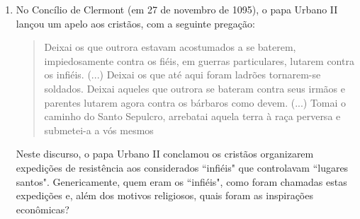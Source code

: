 \documentclass[10pt,a4paper]{article}
\begin{document}
\begin{multicols}{2}
\begin{enumerate}
		\begin{enumerate}
		\item igualit\'aria, com um n\'ivel satisfat\'orio de distribui\c{c}\~ao da renda.
		\item estagnada, com uma relativa harmonia entre as classes.   
		\item tradicional, com a manuten\c{c}\~ao da escravid\~ao nos engenhos como forma produtiva t\'ipica.
		\item ditatorial, perturbada por um constante clima de opress\~ao mantido pelo ex\'ercito e pol\'icia.
		\item agr\'aria, marcada pela concentra\c{c}\~ao da terra e do poder pol\'itico local e regional.
		\end{enumerate}

	\item No Conc\'ilio de Clermont (em 27 de novembro de 1095), o papa Urbano II lan\c{c}ou um apelo aos crist\~aos, com a seguinte prega\c{c}\~ao:
		\begin{quote}
		Deixai os que outrora estavam acostumados a se baterem, impiedosamente contra os fi\'eis, em guerras particulares, lutarem contra os infi\'eis. (...) Deixai os que at\'e aqui foram ladr\~oes tornarem-se soldados. Deixai aqueles que outrora se bateram contra seus irm\~aos e parentes lutarem agora contra os b\'arbaros como devem. (...) Tomai o caminho do Santo Sepulcro, arrebatai aquela terra \`a ra\c{c}a perversa e submetei-a a v\'os mesmos
		\end{quote} 
	Neste discurso, o papa Urbano II conclamou os crist\~aos organizarem expedi\c{c}\~oes de resist\^encia aos considerados ``infi\'eis" que controlavam ``lugares santos". Genericamente, quem eram os ``infi\'eis", como foram chamadas estas expedi\c{c}\~oes e, al\'em dos motivos religiosos, quais foram as inspira\c{c}\~oes econ\^omicas? 


\end{enumerate}
\end{multicols}
\end{document}
